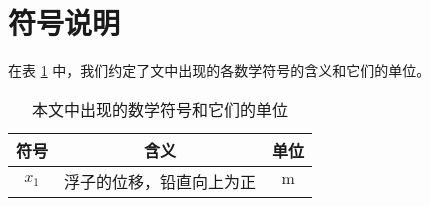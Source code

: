 \section{符号说明}

在表 \ref{symbols} 中，我们约定了文中出现的各数学符号的含义和它们的单位。

\begin{table}[htbp]
    \centering
    \begin{tabular}{ccc}
        \toprule
        符号 & 含义 & 单位 \\
        \midrule
        $x_1$ & 浮子的位移，铅直向上为正 & $\mathrm{m}$ \\
        \bottomrule 
    \end{tabular}
    \caption{本文中出现的数学符号和它们的单位}
    \label{symbols}
\end{table}